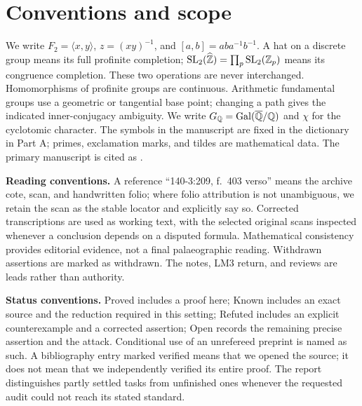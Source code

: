 \section*{Conventions and scope}
We write $F_2=\langle x,y\rangle$, $z=(xy)^{-1}$, and
$[a,b]=aba^{-1}b^{-1}$. A hat on a discrete group means its full profinite
completion; $\operatorname{SL}_2(\widehat{\mathbb Z})=\prod_p\operatorname{SL}_2(\mathbb Z_p)$ means its congruence completion.
These two operations are never interchanged. Homomorphisms of profinite groups
are continuous. Arithmetic fundamental groups use a geometric or tangential
base point; changing a path gives the indicated inner-conjugacy ambiguity.
We write $G_\mathbb Q=\operatorname{Gal}(\overline{\mathbb Q}/\mathbb Q)$ and $\chi$ for the cyclotomic character.
The symbols in the manuscript are fixed in the dictionary in Part A; primes, exclamation marks, and tildes are mathematical data.
The primary manuscript is cited as \citet{Grothendieck1981root}.

\noindent\textbf{Reading conventions.}
A reference ``140-3:209, f.\ 403 verso'' means the archive cote, scan, and handwritten
folio; where folio attribution is not unambiguous, we retain the scan as the
stable locator and explicitly say so. Corrected transcriptions are used as
working text, with the selected original scans inspected whenever a conclusion
depends on a disputed formula. Mathematical consistency provides editorial
evidence, not a final palaeographic reading. Withdrawn assertions are marked as
withdrawn. The notes, LM3 return, and reviews are leads rather than authority.

\noindent\textbf{Status conventions.}
\textsf{Proved} includes a proof here; \textsf{Known} includes an exact source
and the reduction required in this setting; \textsf{Refuted} includes an explicit
counterexample and a corrected assertion; \textsf{Open} records the remaining
precise assertion and the attack. Conditional use of an unrefereed preprint is
named as such. A bibliography entry marked verified means that we opened the
source; it does not mean that we independently verified its entire proof.
The report distinguishes partly settled tasks from unfinished ones whenever
the requested audit could not reach its stated standard.
